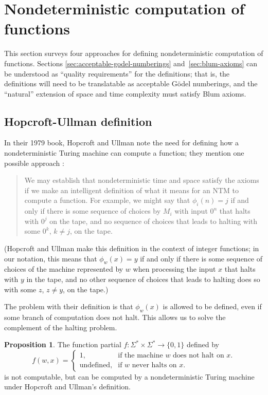 \documentclass[12pt]{article}
\theoremstyle{definition}
\newtheorem{proposition}[definition]{Proposition}
\begin{document}
\section{Nondeterministic computation of functions}
\label{sec:nondeterministic_computation_of_functions}

This section surveys four approaches
for defining nondeterministic computation of functions.
Sections \ref{sec:acceptable-godel-numberings} and~\ref{sec:blum-axioms}
can be understood as ``quality requirements''
for the definitions;
that is, the definitions will need to be translatable as
acceptable Gödel numberings,
and the ``natural'' extension of space and time complexity
must satisfy Blum axioms.

\subsection{Hopcroft-Ullman definition}

In their 1979 book,
Hopcroft and Ullman note the need
for defining how a nondeterministic Turing machine can compute a function;
they mention one possible approach \cite[p.~313]{HopcroftUllman1979}:
\begin{quotation}
    We may establish that nondeterministic time and space
    satisfy the axioms if we make an intelligent definition of what it means
    for an NTM to compute a function.
    For example, we might say that $\phi_i(n) = j$
    if and only if there is some sequence of choices by $M_i$ with input $0^n$
    that halts with $0^j$ on the tape,
    and no sequence of choices that leads to halting with some $0^k$, $k \neq j$,
    on the tape.
\end{quotation}
(Hopcroft and Ullman make this definition in the context of integer functions;
in our notation, this means that $\phi_w(x) = y$
if and only if there is some sequence of choices of the machine represented by $w$
when processing the input $x$ that halts with $y$ in the tape,
and no other sequence of choices that leads to halting does so with some $z$,
$z \neq y$, on the tape.)

The problem with their definition is that $\phi_w(x)$ is allowed to be defined,
even if some branch of computation does not halt.
This allows us to solve the complement of the halting problem.

\begin{proposition}
    The function partial $f: \Sigma^* \times \Sigma^* \to \{0, 1\}$ defined by
    \begin{equation*}
        f(w, x) = \begin{cases}
            1, & \text{if the machine $w$ does not halt on $x$.} \\
            \text{undefined}, &\text{if $w$ never halts on $x$.}
        \end{cases}
    \end{equation*}
    is not computable,
    but can be computed by a nondeterministic Turing machine under
    Hopcroft and Ullman's definition.
\end{proposition}
\end{document}

